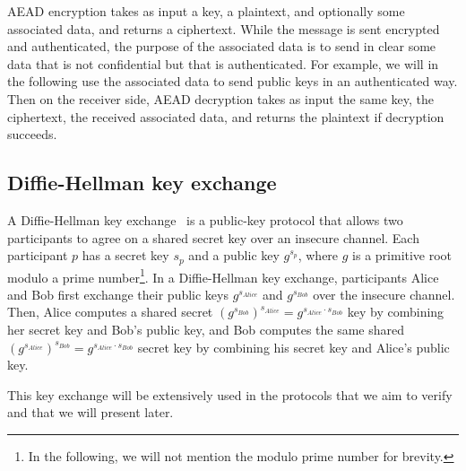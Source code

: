 AEAD encryption takes as input a key, a plaintext, and optionally some associated data, and returns a ciphertext.
While the message is sent encrypted and authenticated, the purpose of the associated data is to send in clear some data that is not confidential but that is authenticated.
For example, we will in the following use the associated data to send public keys in an authenticated way.
Then on the receiver side, AEAD decryption takes as input the same key, the ciphertext, the received associated data, and returns the plaintext if decryption succeeds.

\subsection{Diffie-Hellman key exchange}

A Diffie-Hellman key exchange~\cite{diffie2022new} is a public-key protocol that allows two participants to agree on a shared secret key over an insecure channel.
Each participant $p$ has a secret key $s_p$ and a public key $g^{s_p}$, where $g$ is a primitive root modulo a prime number\footnote{
    In the following, we will not mention the modulo prime number for brevity.
}.
In a Diffie-Hellman key exchange, participants Alice and Bob first exchange their public keys $g^{s_{Alice}}$ and $g^{s_{Bob}}$ over the insecure channel.
Then, Alice computes a shared secret $(g^{s_{Bob}})^{s_{Alice}} = g^{s_{Alice} \cdot s_{Bob}}$ key by combining her secret key and Bob's public key, and Bob computes the same shared $(g^{s_{Alice}})^{s_{Bob}} = g^{s_{Alice} \cdot s_{Bob}}$ secret key by combining his secret key and Alice's public key.

This key exchange will be extensively used in the protocols that we aim to verify and that we will present later.